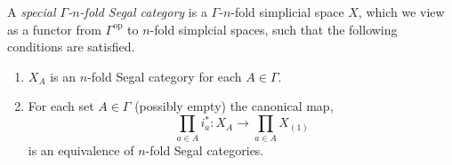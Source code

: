 \documentclass{amsart}
\begin{document}


\begin{definition}
	A {\em special $\Gamma$-$n$-fold Segal category} is a $\Gamma$-$n$-fold simplicial space $X$, which we view as a functor from $\Gamma^\textrm{op}$ to $n$-fold simplcial spaces, such that the following conditions are satisfied. 
	\begin{enumerate}
		\item $X_A$ is an $n$-fold Segal category for each $A \in \Gamma$. 
		\item For each set $A \in \Gamma$ (possibly empty) the canonical map,
		\begin{equation*}
			\prod_{a \in A} i_a^*: X_A \to \prod_{a \in A} X_{(1)}
		\end{equation*}
		is an equivalence of $n$-fold Segal categories. %
	\end{enumerate}
\end{definition}

\end{document}

